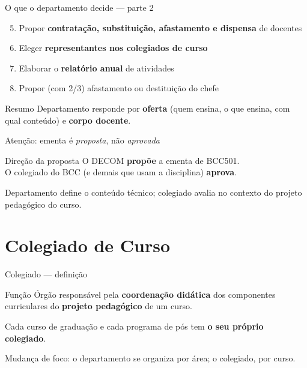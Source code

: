 \documentclass[aspectratio=169]{beamer}
\newcommand{\impt}[1]{\textcolor{maccent}{\textbf{#1}}}
\newcommand{\ntc}[1]{\textcolor{mprimary}{#1}}
\begin{document}
\begin{frame}{O que o departamento decide --- parte 2}
  \begin{enumerate}
    \setcounter{enumi}{4}
    \item Propor \impt{contratação, substituição, afastamento e dispensa} de docentes
    \item Eleger \impt{representantes nos colegiados de curso}
    \item Elaborar o \impt{relatório anual} de atividades
    \item Propor (com 2/3) afastamento ou destituição do chefe
  \end{enumerate}

  \vspace{0.4cm}
  \begin{alertblock}{Resumo}
    Departamento responde por \impt{oferta} (quem ensina, o que ensina, com qual conteúdo) e \impt{corpo docente}.
  \end{alertblock}
\end{frame}

\begin{frame}{Atenção: ementa é \emph{proposta}, não \emph{aprovada}}
  \begin{block}{Direção da proposta}
    O DECOM \impt{propõe} a ementa de BCC501.\\
    O colegiado do BCC (e demais que usam a disciplina) \impt{aprova}.
  \end{block}

  \vspace{0.4cm}
   
  \ntc{Departamento define o conteúdo técnico; colegiado avalia no contexto do projeto pedagógico do curso.}
\end{frame}

\section{Colegiado de Curso}

\begin{frame}{Colegiado --- definição}
  \begin{block}{Função}
    Órgão responsável pela \impt{coordenação didática} dos componentes curriculares do \impt{projeto pedagógico} de um curso.
  \end{block}

  \vspace{0.4cm}
   
  Cada curso de graduação e cada programa de pós tem \impt{o seu próprio colegiado}.

  \vspace{0.3cm}
   
  \ntc{Mudança de foco: o departamento se organiza por área; o colegiado, por curso.}
\end{frame}
\end{document}
